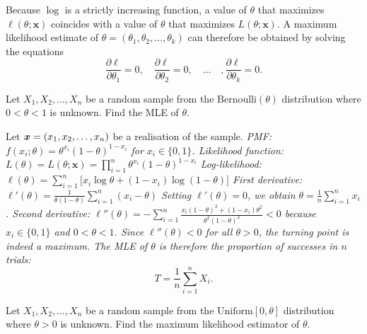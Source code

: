 Because $\log$ is a strictly increasing function, a value of $\theta$ that maximizes $\ell(\theta;\mathbf{x})$ coincides with a value of $\theta$ that maximizes $L(\theta;\mathbf{x})$. A maximum likelihood estimate of $\theta=(\theta_1,\theta_2,\ldots,\theta_k)$ can therefore be obtained by solving the equations
\[
\frac{\partial\ell}{\partial\theta_1}=0,
\quad
\frac{\partial\ell}{\partial\theta_2}=0,
\quad\ldots\quad,
\frac{\partial\ell}{\partial\theta_k}=0.
\]

\begin{example}
Let $X_1,X_2,\ldots,X_n$ be a random sample from the $\text{Bernoulli}(\theta)$ distribution where $0<\theta<1$ is unknown. Find the MLE of $\theta$.
\begin{solution}
Let $\boldsymbol{x} = (x_1,x_2,\ldots,x_n)$ be a realisation of the sample.
\bit
\it PMF: $ f(x_i;\theta) = \theta^{x_i} (1-\theta)^{1-x_i}$ for $x_i\in\{0,1\}$.
\it Likelihood function: $ L(\theta) = L(\theta;\mathbf{x}) = \prod_{i=1}^n \theta^{x_i} (1-\theta)^{1-x_i}$
\it Log-likelihood: $ \ell(\theta) = \sum_{i=1}^n\big[ x_i\log\theta + (1-x_i)\log(1-\theta) \big]$
\it First derivative: $ \ell'(\theta) = \frac{1}{\theta(1-\theta)}\sum_{i=1}^n (x_i - \theta)$
\it Setting $\ell'(\theta)=0$, we obtain $ \theta = \frac{1}{n}\sum_{i=1}^n x_i$.
\it Second derivative: 
$ \ell''(\theta) = -\sum_{i=1}^n \frac{x_i(1-\theta)^2 + (1-x_i)\theta^2}{\theta^2(1-\theta)^2} < 0$ because $x_i\in\{0,1\}$ and $0<\theta<1$.
\it Since $\ell''(\theta) < 0$ for all $\theta>0$, the turning point is indeed a maximum.
\it The MLE of $\theta$ is therefore the proportion of successes in $n$ trials:
\[
T = \frac{1}{n}\sum_{i=1}^n X_i.
\]
\eit
\end{solution}
\end{example}

\begin{example}\label{ex:mleuniform}
Let $X_1,X_2,\ldots,X_n$ be a random sample from the $\text{Uniform}[0,\theta]$ distribution where $\theta>0$ is unknown. Find the maximum likelihood estimator of $\theta$.
\end{example}


